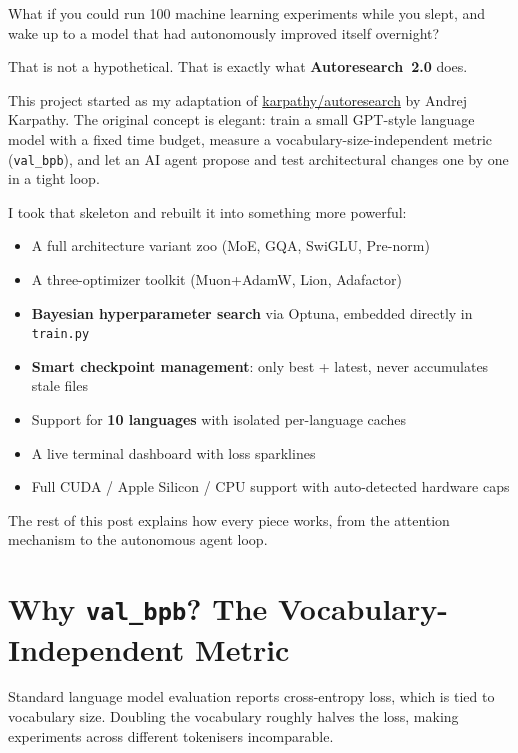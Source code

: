 \documentclass[12pt, a4paper]{article}
\newcommand{\bpb}{\texttt{val\_bpb}}
\newcommand{\trainpy}{\texttt{train.py}}
\begin{document}
What if you could run 100 machine learning experiments while you slept, and wake up to a model
that had autonomously improved itself overnight?

That is not a hypothetical. That is exactly what \textbf{Autoresearch~2.0} does.

This project started as my adaptation of
\href{https://github.com/karpathy/autoresearch}{karpathy/autoresearch} by Andrej Karpathy.
The original concept is elegant: train a small GPT-style language model with a fixed time
budget, measure a vocabulary-size-independent metric (\bpb{}), and let an AI agent propose and
test architectural changes one by one in a tight loop.

I took that skeleton and rebuilt it into something more powerful:

\begin{itemize}[leftmargin=*, itemsep=2pt]
  \item A full architecture variant zoo (MoE, GQA, SwiGLU, Pre-norm)
  \item A three-optimizer toolkit (Muon+AdamW, Lion, Adafactor)
  \item \textbf{Bayesian hyperparameter search} via Optuna, embedded directly in \trainpy{}
  \item \textbf{Smart checkpoint management}: only best + latest, never accumulates stale files
  \item Support for \textbf{10 languages} with isolated per-language caches
  \item A live terminal dashboard with loss sparklines
  \item Full CUDA / Apple Silicon / CPU support with auto-detected hardware caps
\end{itemize}

The rest of this post explains how every piece works, from the attention mechanism to the
autonomous agent loop.

\section{Why \texttt{val\_bpb}? The Vocabulary-Independent Metric}

Standard language model evaluation reports cross-entropy loss, which is tied to vocabulary
size. Doubling the vocabulary roughly halves the loss, making experiments across different
tokenisers incomparable.
\end{document}
